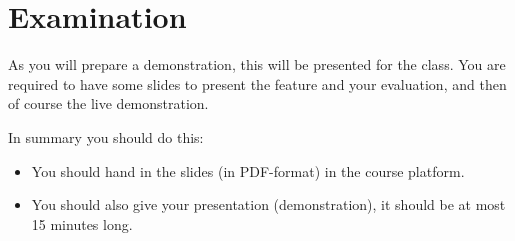 \documentclass[a4paper,nocourse]{miunasgn}
\begin{document}
\section{Examination}
\label{sec:examination}
As you will prepare a demonstration, this will be presented for the class.
You are required to have some slides to present the feature and your 
evaluation, and then of course the live demonstration.

In summary you should do this:
\begin{itemize}
  \item You should hand in the slides (in PDF-format) in the course platform.
  \item You should also give your presentation (demonstration), it should be at 
    most 15 minutes long.
\end{itemize}


\printbibliography
\end{document}
